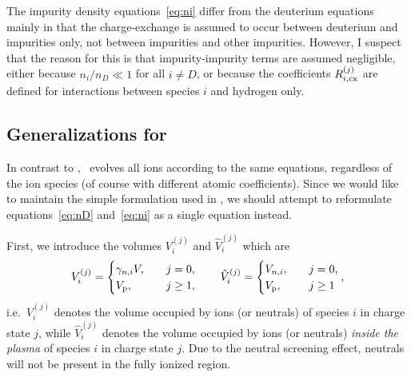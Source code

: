 \documentclass{notes}
\newcommand{\tDREAM}{{\mdseries\DREAM}}
\newcommand{\Vp}{V_{\rm p}}
\begin{document}
    The impurity density equations~\eqref{eq:ni} differ from the deuterium
    equations mainly in that the charge-exchange is assumed to occur between
    deuterium and impurities only, not between impurities and other impurities.
    However, I suspect that the reason for this is that impurity-impurity terms
    are assumed negligible, either because $n_i/n_D\ll 1$ for all $i\neq D$, or
    because the coefficients $R_{i,{\rm cx}}^{(j)}$ are defined for interactions
    between species $i$ and hydrogen only.

    \subsection{Generalizations for \tDREAM}
    In contrast to \DYON, \DREAM\ evolves all ions according to the same
    equations, regardless of the ion species (of course with different atomic
    coefficients). Since we would like to maintain the simple formulation used
    in \DREAM, we should attempt to reformulate equations~\eqref{eq:nD}
    and~\eqref{eq:ni} as a single equation instead.

    First, we introduce the volumes $V_i^{(j)}$ and $\hat{V}_i^{(j)}$ which
    are
    \begin{equation}
        V_i^{(j)} = \begin{cases}
            \gamma_{n,i}V,&\quad j=0,\\
            \Vp, &\quad j\geq 1,
        \end{cases}\qquad
        \hat{V}_i^{(j)} = \begin{cases}
            V_{n,i}, &\quad j=0,\\
            \Vp, &\quad j\geq 1
        \end{cases},
    \end{equation}
    i.e.\ $V_i^{(j)}$ denotes the volume occupied by ions (or neutrals) of
    species $i$ in charge state $j$, while $\hat{V}_i^{(j)}$ denotes the
    volume occupied by ions (or neutrals) \emph{inside the plasma} of species
    $i$ in charge state $j$. Due to the neutral screening effect, neutrals will
    not be present in the fully ionized region.
\end{document}
